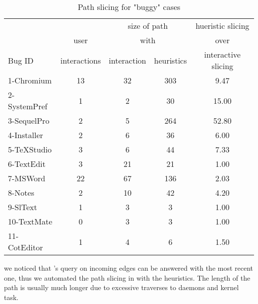 \begin{table}[ht]
\footnotesize
\centering
  \begin{tabularx}{\columnwidth}{l|cccc}
 	   &       &\multicolumn{2}{c}{size of path}& hueristic slicing\\
       & user  & \multicolumn{2}{c}{with}  & over \\
Bug ID & interactions & interaction & heuristics  &  interactive slicing\\
\hline
\hline
1-Chromium  & 13 & 32 & 303 & 9.47\\
2-SystemPref & 1 & 2 & 30 & 15.00\\
3-SequelPro  & 2 & 5 & 264 & 52.80\\
4-Installer  & 2 & 6 & 36  & 6.00\\
5-TeXStudio  & 3 & 6 & 44  & 7.33\\
6-TextEdit  & 3 & 21 & 21 & 1.00\\
7-MSWord  & 22 & 67 & 136 & 2.03\\
8-Notes  & 2 & 10 & 42 & 4.20\\
9-SlText  & 1 & 3 & 3 & 1.00\\
10-TextMate  & 0 & 3 & 3 & 1.00\\
11-CotEditor  & 1 & 4 & 6 & 1.50\\
\hline
  \end{tabularx}
  \parbox{\columnwidth}
  {\caption{Path slicing for "buggy" cases} 
	{
	we noticed that \xxx's query on incoming edges can be answered with the most
	recent one, thus we automated the path slicing in \xxx with the heuristics.
	The length of the path is usually much longer due to excessive traverses to
	daemons and kernel task.
    }
  \label{table:results}
  }
\end{table}
